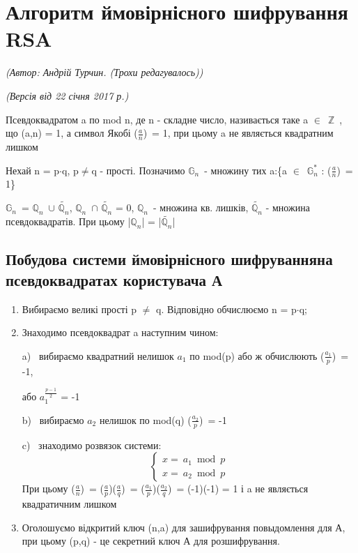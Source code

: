 

\section{Алгоритм ймовірнісного шифрування RSA}
\begin{flushright}
\emph{(Автор: Андрій Турчин. (Трохи редагувалось))}
\par \emph{(Версія від 22 січня 2017 р.)}
\end{flushright}

\mydef Псевдоквадратом a по mod n, де n - складне число, називається таке a $\in$\ $\mathbb{Z}$\ , що (a,n) = 1, а символ Якобі ($\frac{a}{n}$)\ = 1, при цьому a не являється квадратним лишком   

Нехай n = p$\cdot$q, p$\neq$q - прості. Позначимо $\mathbb{G}_{n}$\ - множину тих a:\{a $\in$\ $\mathbb{G}^{*}_{n}$ : ($\frac{a}{n}$)\ = 1\}

${\mathbb{G}_{n}}$\ = ${\mathbb{Q}_{n}}$\ $\cup$ $\tilde{\mathbb{Q}_{n}}$,  ${\mathbb{Q}_{n}}$\ $\cap$ $\tilde{\mathbb{Q}_{n}}$ = 0, ${\mathbb{Q}_{n}}$\ - множина кв. лишків, $\tilde{\mathbb{Q}_{n}}$ - множина псевдоквадратів. При цьому |${\mathbb{Q}_{n}}$| = |$\tilde{\mathbb{Q}_{n}}$| 

\subsection{Побудова системи ймовірнісного шифруванняна псевдоквадратах користувача А}

\begin{enumerate}
\item Вибираємо великі прості p $\neq$ q. Відповідно обчислюємо n = p$\cdot$q;

\item Знаходимо псевдоквадрат a наступним чином:

a) \ вибираємо квадратний нелишок $a_{1}$ по mod(p) або ж обчислюють ($\frac{a_{1}}{p}$)\ = -1, 

або $a_{1}^{\frac{p-1}{2}}$ = -1

b) \ вибираємо $a_{2}$ нелишок по mod(q) ($\frac{a_{2}}{p}$)\ = -1

c) \ знаходимо розвязок системи:
\begin{equation*} 
\begin{cases}
x =\ a_{1} \bmod p \\
x =\ a_{2} \bmod p
\end{cases}
\end{equation*}
При цьому ($\frac{a}{n}$)\ = ($\frac{a}{p}$)($\frac{a}{q}$)\ = ($\frac{a_{1}}{p}$)($\frac{a_{2}}{q}$)\ = (-1)(-1) = 1 і a не являється квадратичним лишком

\item  Оголошуємо відкритий ключ (n,a) для зашифрування повыдомлення для А, при цьому (p,q) - це секретний ключ А для розшифрування.
\end{enumerate}

